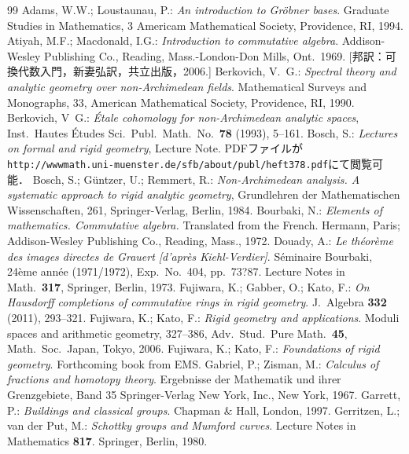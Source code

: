 \documentclass[a4paper,12pt, dvipdfmx]{jsbook}
\theoremstyle{plain}
\theoremstyle{definition}
\begin{document}
\clearpage
{}
\begin{thebibliography}{99}
Adams, W.W.; Loustaunau, P.: {\it An introduction to Gr\"obner bases}. Graduate Studies in Mathematics, 3 Americam Mathematical Society, Providence, RI, 1994.
 Atiyah, M.F.; Macdonald, I.G.: {\it Introduction to commutative algebra}. Addison-Wesley Publishing Co., Reading, Mass.-London-Don Mills, Ont.\ 1969. [邦訳：可換代数入門，新妻弘訳，共立出版，2006.]
Berkovich, V.\ G.: {\it Spectral theory and analytic geometry over non-Archimedean fields}. Mathematical Surveys and Monographs, 33, American Mathematical Society, Providence, RI, 1990.
Berkovich, V\ G.: {\it \'Etale cohomology for non-Archimedean analytic spaces}, Inst.\ Hautes \'Etudes Sci.\ Publ.\ Math.\ No.\ {\bf 78} (1993), 5--161.
Bosch, S.: {\it Lectures on formal and rigid geometry}, Lecture Note. PDFファイルが{\tt http://wwwmath.uni-muenster.de/sfb/about/publ/heft378.pdf}にて閲覧可能．
Bosch, S.; G\"untzer, U.; Remmert, R.: {\it Non-Archimedean analysis. A systematic approach to rigid analytic geometry}, Grundlehren der Mathematischen Wissenschaften, 261, Springer-Verlag, Berlin, 1984.
Bourbaki, N.: {\it Elements of mathematics. Commutative algebra.} Translated from the French. Hermann, Paris; Addison-Wesley Publishing Co., Reading, Mass., 1972.
Douady, A.: {\it Le th\'eor\`eme des images directes de Grauert [d'apr\`es Kiehl-Verdier]}. S\'eminaire Bourbaki, 24\`eme ann\'ee (1971/1972), Exp.\ No.\ 404, pp.\ 73?87. Lecture Notes in Math.\ {\bf 317}, Springer, Berlin, 1973.
Fujiwara, K.; Gabber, O.; Kato, F.: {\it On Hausdorff completions of commutative rings in rigid geometry}. J.\ Algebra {\bf 332} (2011), 293--321.
Fujiwara, K.; Kato, F.: {\it Rigid geometry and applications}. Moduli spaces and arithmetic geometry, 327--386, Adv.\ Stud.\ Pure Math.\ {\bf 45}, Math.\ Soc.\ Japan, Tokyo, 2006.
Fujiwara, K.; Kato, F.: {\it Foundations of rigid geometry}. Forthcoming book from EMS.
Gabriel, P.; Zisman, M.: {\it Calculus of fractions and homotopy theory}. Ergebnisse der Mathematik und ihrer Grenzgebiete, Band 35 Springer-Verlag New York, Inc., New York, 1967.
Garrett, P.: {\it Buildings and classical groups}. Chapman \& Hall, London, 1997.
Gerritzen, L.; van der Put, M.: {\it Schottky groups and Mumford curves}. Lecture Notes in Mathematics {\bf 817}. Springer, Berlin, 1980.

\end{thebibliography}
\end{document}
